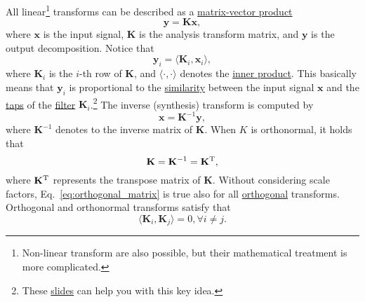 All linear\footnote{Non-linear transform are also possible, but their
mathematical treatment is more complicated.}  transforms can be
described as a
\href{https://en.wikipedia.org/wiki/Matrix_multiplication}{matrix-vector
  product}~\cite{strang4linear}
\begin{equation}
  \mathbf{y} = \mathbf{K}\mathbf{x},
  \label{eq:forward_transform_matrix_form}
\end{equation}
where $\mathbf{x}$ is the input signal, $\mathbf{K}$ is the analysis
transform matrix, and $\mathbf{y}$ is the output decomposition. Notice
that
\begin{equation}
  {\mathbf{y}}_i = \langle {\mathbf{K}}_i, {\mathbf{x}}_i\rangle,
\end{equation}
where ${\mathbf{K}}_i$ is the $i$-th row of $\mathbf{K}$, and
$\langle\cdot,\cdot\rangle$ denotes the
\href{https://mathworld.wolfram.com/InnerProduct.html}{inner
  product}. This basically means that ${\mathbf{y}}_i$ is proportional to the
\href{https://en.wikipedia.org/wiki/Similarity_(geometry)}{similarity}
between the input signal $\mathbf{x}$ and the
\href{https://en.wikipedia.org/wiki/Finite_impulse_response}{taps} of
the \href{https://en.wikipedia.org/wiki/Digital_filter}{filter}
${\mathbf{K}}_i$.\footnote{These
\href{https://cseweb.ucsd.edu/classes/fa17/cse166-a/lec13.pdf}{slides}
can help you with this key idea.} The inverse (synthesis) transform is
computed by
\begin{equation}
  \mathbf{x} = {\mathbf{K}}^{-1}\mathbf{y},
  \label{eq:backward_transform_matrix_form}
\end{equation}
where ${\mathbf{K}}^{-1}$ denotes to the inverse matrix of $\mathbf{K}$. When $K$ is orthonormal, it holds that
\begin{equation}
  \mathbf{K}={\mathbf{K}}^{-1}={\mathbf{K}}^{\text T},
  \label{eq:orthogonal_matrix}
\end{equation}
where ${\mathbf{K}}^{\text T}$ represents the transpose matrix of
$\mathbf{K}$. Without considering scale factors,
Eq.~\ref{eq:orthogonal_matrix} is true also for all
\href{https://en.wikipedia.org/wiki/Orthogonality}{orthogonal}
transforms. Orthogonal and orthonormal transforms satisfy that
\begin{equation}
  \langle {\mathbf{K}}_i, {\mathbf{K}}_j\rangle = 0, \forall i\neq j.
\end{equation}

